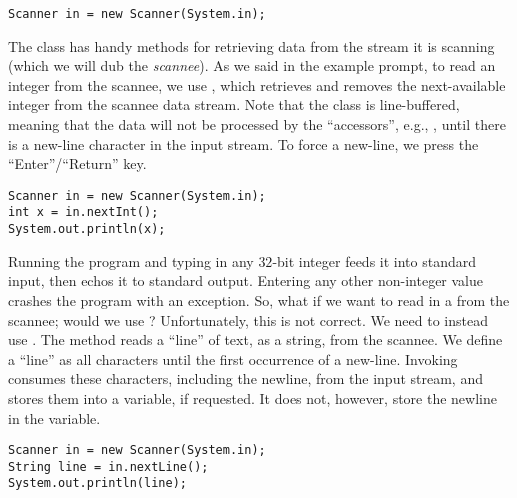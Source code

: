 \begin{verbatim}
Scanner in = new Scanner(System.in);
\end{verbatim}

The  class has handy methods for retrieving data from the stream it is scanning (which we will dub the \textit{scannee}). As we said in the example prompt, to read an integer from the scannee, we use , which retrieves and removes the next-available integer from the scannee data stream. Note that the  class is line-buffered, meaning that the data will not be processed by the ``accessors'', e.g., , until there is a new-line character in the input stream. To force a new-line, we press the ``Enter''/``Return'' key.

\begin{verbatim}
Scanner in = new Scanner(System.in);
int x = in.nextInt();
System.out.println(x);
\end{verbatim}

Running the program and typing in any $32$-bit integer feeds it into standard input, then echos it to standard output. Entering any other non-integer value crashes the program with an  exception. So, what if we want to read in a  from the scannee; would we use ? Unfortunately, this is not correct. We need to instead use . The  method reads a ``line'' of text, as a string, from the scannee. We define a ``line'' as all characters until the first occurrence of a new-line. Invoking  consumes these characters, including the newline, from the input stream, and stores them into a variable, if requested. It does not, however, store the newline in the variable. 

\begin{verbatim}
Scanner in = new Scanner(System.in);
String line = in.nextLine();
System.out.println(line);
\end{verbatim}

